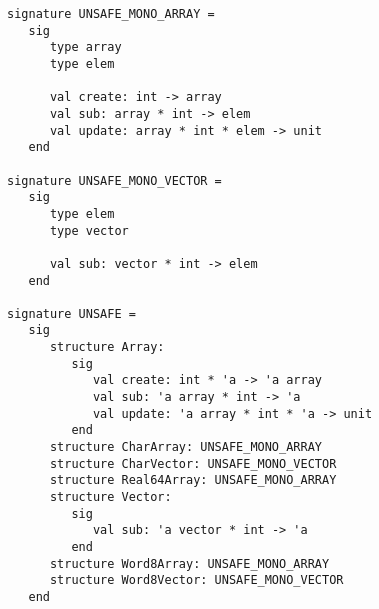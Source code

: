 \begin{verbatim}
signature UNSAFE_MONO_ARRAY =
   sig
      type array
      type elem

      val create: int -> array
      val sub: array * int -> elem
      val update: array * int * elem -> unit
   end

signature UNSAFE_MONO_VECTOR =
   sig
      type elem
      type vector

      val sub: vector * int -> elem
   end

signature UNSAFE =
   sig
      structure Array:
         sig
            val create: int * 'a -> 'a array
            val sub: 'a array * int -> 'a
            val update: 'a array * int * 'a -> unit
         end
      structure CharArray: UNSAFE_MONO_ARRAY
      structure CharVector: UNSAFE_MONO_VECTOR
      structure Real64Array: UNSAFE_MONO_ARRAY
      structure Vector:
         sig
            val sub: 'a vector * int -> 'a
         end
      structure Word8Array: UNSAFE_MONO_ARRAY
      structure Word8Vector: UNSAFE_MONO_VECTOR
   end
\end{verbatim}
